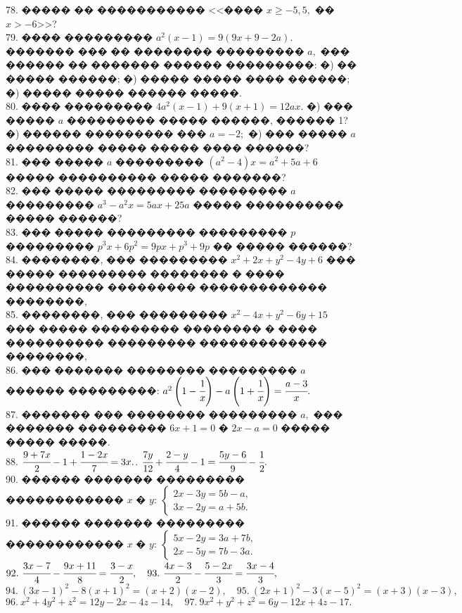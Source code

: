 \documentclass[12pt]{article}
\begin{document}
78. ����� �� ����������� <<���� $x\geqslant-5,5,$ �� $x>-6$>>?\\
79. ���� ��������� $a^2(x-1)=9(9x+9-2a).$ ������� ��� �� �������� ��������� $a,$ ��� ������ �� ������� ������ ���������: �) �� ����� ������; �) ����� ����� ���� ������; �) ����� ����� ������ �����.\\
80. ���� ��������� $4a^2(x-1)+9(x+1)=12ax.$ �) ��� ����� $a$ ��������� ����� ������, ������ 1? �) ������ ��������� ��� $a=-2;$ �) ��� ����� $a$ ��������� ����� ����� ���� ������?\\
81. ��� ����� $a$ ��������� $(a^2-4)x=a^2+5a+6$ ����� ���������� ����� �������?\\
82. ��� ����� ��������� ��������� $a$ ��������� $a^3-a^2x=5ax+25a$ ����� ���������� ����� ������?\\
83. ��� ����� ��������� ��������� $p$ ��������� $p^3x+6p^2=9px+p^3+9p$ �� ����� ������?\\
84. ��������, ��� ��������� $x^2+2x+y^2-4y+6$ ��� ����� ��������� �������� � ���� ���������� ��������� ������������� ��������,\\
85. ��������, ��� ��������� $x^2-4x+y^2-6y+15$ ��� ����� ��������� �������� � ���� ���������� ��������� ������������� ��������,\\
86. ��� ������� �������� ��������� $a$ ������ ���������: $a^2\left(1-\cfrac{1}{x}\right)-a\left(1+\cfrac{1}{x}\right)=\cfrac{a-3}{x}.$\\
87. ������� ��� �������� ��������� $a,$ ��� ������� ��������� $6x+1=0$ � $2x-a=0$ ����� ����� �����.\\
88. $\cfrac{9+7x}{2}-1+\cfrac{1-2x}{7}=3x.$\qquad{}. $\cfrac{7y}{12}+\cfrac{2-y}{4}-1=\cfrac{5y-6}{9}-\cfrac{1}{2}.$\\
90. ������ ������� ��������� ������������ $x$ � $y:\ \begin{cases}2x-3y=5b-a,\\ 3x-2y=a+5b. \end{cases}$\\
91. ������ ������� ��������� ������������ $x$ � $y:\ \begin{cases}5x-2y=3a+7b,\\ 2x-5y=7b-3a. \end{cases}$\\
$92.\ \cfrac{3x-7}{4}-\cfrac{9x+11}{8}=\cfrac{3-x}{2}, \quad 93.\ \cfrac{4x-3}{2}-\cfrac{5-2x}{3}=\cfrac{3x-4}{3},$\\
$94.\ (3x-1)^2-8(x+1)^2=(x+2)(x-2), \quad 95.\ (2x+1)^2-3(x-5)^2=(x+3)(x-3),$\\
$96.\ x^2+4y^2+z^2=12y-2x-4z-14, \quad 97.\ 9x^2+y^2+z^2=6y-12x+4z-17.$\\
\end{document}
